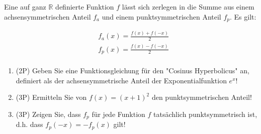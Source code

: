 Eine auf ganz $\mathbb{R}$ definierte Funktion $f$ lässt sich zerlegen in die Summe aus einem achsensymmetrischen Anteil $f_a$ und einem punktsymmetrischen Anteil $f_p$. Es gilt:

\begin{align*}
&f_a(x) = \frac{f(x)+f(-x)}{2}\\
&f_p(x)= \frac{f(x)-f(-x)}{2}\\
\end{align*}

\begin{enumerate}[label=(\alph*)]

\item (2P) Geben Sie eine Funktionsgleichung für den "Cosinus Hyperbolicus" an, definiert als der achsensymmetrische Anteil der Exponentialfunktion $e^x$!

\bigskip
\bigskip
\bigskip
\bigskip
\bigskip
\bigskip
\bigskip
\bigskip

\item (3P) Ermitteln Sie von $f(x) = (x+1)^2$ den punktsymmetrischen Anteil!

\bigskip
\bigskip
\bigskip
\bigskip
\bigskip
\bigskip
\bigskip
\bigskip
\bigskip
\bigskip
\bigskip
\bigskip

\item (3P) Zeigen Sie, dass $f_p$ für jede Funktion $f$ tatsächlich punktsymmetrisch ist, d.h. dass $f_p(-x) = -f_p(x)$ gilt!


\end{enumerate}
